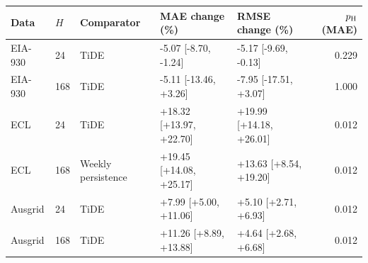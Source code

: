 {
\footnotesize
\begin{tabular}{lllp{3.65cm}p{3.65cm}r}
\toprule
Data & $H$ & Comparator & MAE change (\%) & RMSE change (\%) & $p_{\rm H}$ (MAE) \\
\midrule
EIA-930 & 24 & TiDE & -5.07 [-8.70, -1.24] & -5.17 [-9.69, -0.13] & 0.229 \\
EIA-930 & 168 & TiDE & -5.11 [-13.46, +3.26] & -7.95 [-17.51, +3.07] & 1.000 \\
ECL & 24 & TiDE & +18.32 [+13.97, +22.70] & +19.99 [+14.18, +26.01] & 0.012 \\
ECL & 168 & Weekly persistence & +19.45 [+14.08, +25.17] & +13.63 [+8.54, +19.20] & 0.012 \\
Ausgrid & 24 & TiDE & +7.99 [+5.00, +11.06] & +5.10 [+2.71, +6.93] & 0.012 \\
Ausgrid & 168 & TiDE & +11.26 [+8.89, +13.88] & +4.64 [+2.68, +6.68] & 0.012 \\
\bottomrule
\end{tabular}
}
